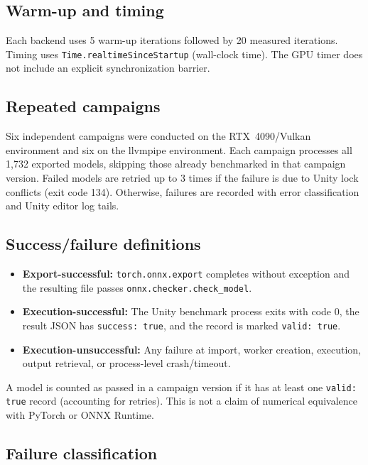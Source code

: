 \documentclass[10pt,twocolumn,letterpaper]{article}
\begin{document}
\subsection{Warm-up and timing}

Each backend uses 5 warm-up iterations followed by 20 measured iterations. Timing uses \texttt{Time.realtimeSinceStartup} (wall-clock time). The GPU timer does not include an explicit synchronization barrier.

\subsection{Repeated campaigns}

Six independent campaigns were conducted on the RTX~4090/Vulkan environment and six on the llvmpipe environment. Each campaign processes all 1,732 exported models, skipping those already benchmarked in that campaign version. Failed models are retried up to 3 times if the failure is due to Unity lock conflicts (exit code 134). Otherwise, failures are recorded with error classification and Unity editor log tails.

\subsection{Success/failure definitions}

\begin{itemize}[nosep,leftmargin=*]
  \item \textbf{Export-successful:} \texttt{torch.onnx.export} completes without exception and the resulting file passes \texttt{onnx.checker.check\_model}.
  \item \textbf{Execution-successful:} The Unity benchmark process exits with code 0, the result JSON has \texttt{success: true}, and the record is marked \texttt{valid: true}.
  \item \textbf{Execution-unsuccessful:} Any failure at import, worker creation, execution, output retrieval, or process-level crash/timeout.
\end{itemize}

A model is counted as passed in a campaign version if it has at least one \texttt{valid: true} record (accounting for retries). This is not a claim of numerical equivalence with PyTorch or ONNX Runtime.

\subsection{Failure classification}
\end{document}
